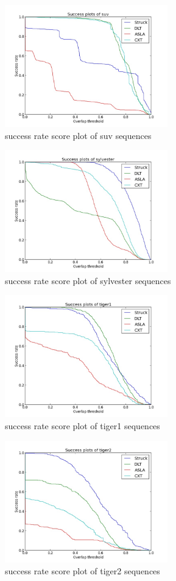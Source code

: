 \documentclass{acm_proc_article-sp}
\begin{document}
\begin{figure}[hbt]
    \includegraphics[width=200pt]{suv.jpg}
    \caption{success rate score plot of suv sequences}
    \label{fig:suv}
\end{figure}

\begin{figure}[hbt]
    \includegraphics[width=200pt]{sylvester.jpg}
    \caption{success rate score plot of sylvester sequences}
    \label{fig:sylvester}
\end{figure}

\begin{figure}[hbt]
    \includegraphics[width=200pt]{tiger1.jpg}
    \caption{success rate score plot of tiger1 sequences}
    \label{fig:tiger1}
\end{figure}

\begin{figure}[hbt]
    \includegraphics[width=200pt]{tiger2.jpg}
    \caption{success rate score plot of tiger2 sequences}
    \label{fig:tiger2}
\end{figure}
\end{document}
